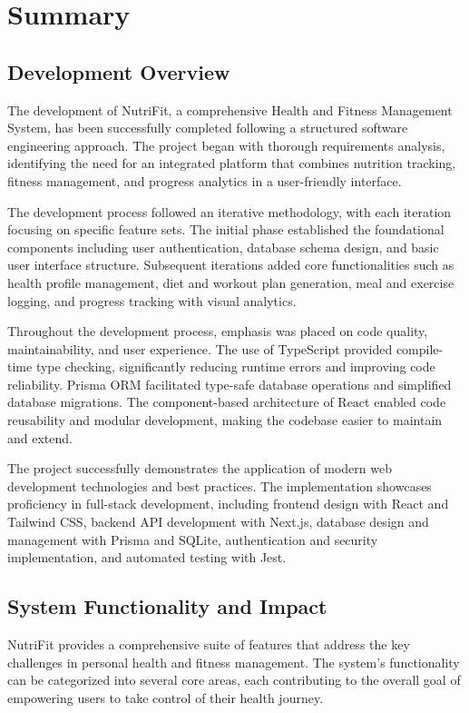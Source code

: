 \chapter{Summary}

\section{Development Overview}

The development of NutriFit, a comprehensive Health and Fitness Management System, has been successfully completed following a structured software engineering approach. The project began with thorough requirements analysis, identifying the need for an integrated platform that combines nutrition tracking, fitness management, and progress analytics in a user-friendly interface.

The development process followed an iterative methodology, with each iteration focusing on specific feature sets. The initial phase established the foundational components including user authentication, database schema design, and basic user interface structure. Subsequent iterations added core functionalities such as health profile management, diet and workout plan generation, meal and exercise logging, and progress tracking with visual analytics.

Throughout the development process, emphasis was placed on code quality, maintainability, and user experience. The use of TypeScript provided compile-time type checking, significantly reducing runtime errors and improving code reliability. Prisma ORM facilitated type-safe database operations and simplified database migrations. The component-based architecture of React enabled code reusability and modular development, making the codebase easier to maintain and extend.

The project successfully demonstrates the application of modern web development technologies and best practices. The implementation showcases proficiency in full-stack development, including frontend design with React and Tailwind CSS, backend API development with Next.js, database design and management with Prisma and SQLite, authentication and security implementation, and automated testing with Jest.

\section{System Functionality and Impact}

NutriFit provides a comprehensive suite of features that address the key challenges in personal health and fitness management. The system's functionality can be categorized into several core areas, each contributing to the overall goal of empowering users to take control of their health journey.

